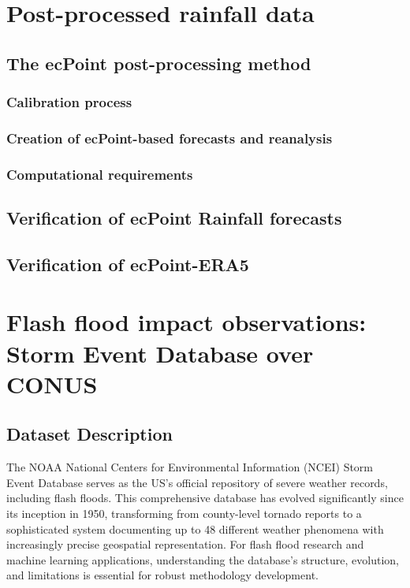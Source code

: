 \section{Post-processed rainfall data}

\subsection{The ecPoint post-processing method}

\subsubsection{Calibration process}

\subsubsection{Creation of ecPoint-based forecasts and reanalysis}

\subsubsection{Computational requirements}


\subsection{Verification of ecPoint Rainfall forecasts}


\subsection{Verification of ecPoint-ERA5}



\section{Flash flood impact observations: Storm Event Database over CONUS}

\subsection{Dataset Description}

The NOAA National Centers for Environmental Information (NCEI) Storm Event Database serves as the US's official repository of severe weather records, including flash floods. This comprehensive database has evolved significantly since its inception in 1950, transforming from county-level tornado reports to a sophisticated system documenting up to 48 different weather phenomena with increasingly precise geospatial representation. For flash flood research and machine learning applications, understanding the database's structure, evolution, and limitations is essential for robust methodology development. 

